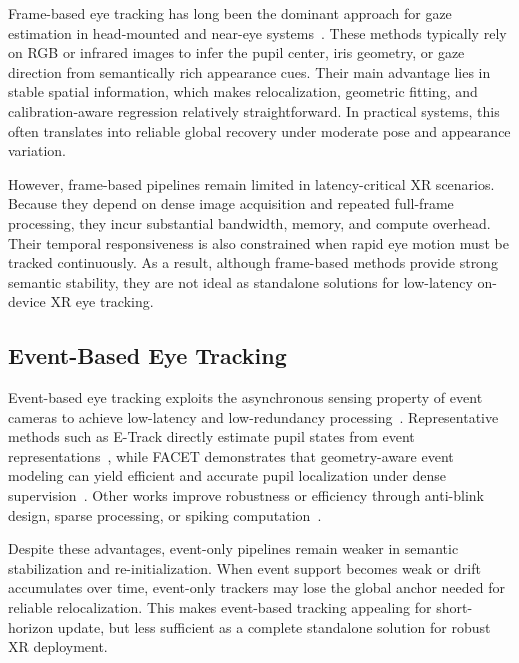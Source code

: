 ﻿\documentclass[journal]{IEEEtran}
\begin{document}
Frame-based eye tracking has long been the dominant approach for gaze estimation in head-mounted and near-eye systems~\cite{li2018etracker,chen2022real,jain2025flattrack}. These methods typically rely on RGB or infrared images to infer the pupil center, iris geometry, or gaze direction from semantically rich appearance cues. Their main advantage lies in stable spatial information, which makes relocalization, geometric fitting, and calibration-aware regression relatively straightforward. In practical systems, this often translates into reliable global recovery under moderate pose and appearance variation.

However, frame-based pipelines remain limited in latency-critical XR scenarios. Because they depend on dense image acquisition and repeated full-frame processing, they incur substantial bandwidth, memory, and compute overhead. Their temporal responsiveness is also constrained when rapid eye motion must be tracked continuously. As a result, although frame-based methods provide strong semantic stability, they are not ideal as standalone solutions for low-latency on-device XR eye tracking.

\subsection{Event-Based Eye Tracking}

Event-based eye tracking exploits the asynchronous sensing property of event cameras to achieve low-latency and low-redundancy processing~\cite{li2024gaze,li2023track,ding2025facet,zhang2024swift,sen2024eyetraes,chen20233et,chen2025event,feng2022real,lai2026efficient,wang2024event,lenero20113,zhao2025ev}. Representative methods such as E-Track directly estimate pupil states from event representations~\cite{li2023track}, while FACET demonstrates that geometry-aware event modeling can yield efficient and accurate pupil localization under dense supervision~\cite{ding2025facet}. Other works improve robustness or efficiency through anti-blink design, sparse processing, or spiking computation~\cite{zhang2024swift,sen2024eyetraes,sui2026event}.

Despite these advantages, event-only pipelines remain weaker in semantic stabilization and re-initialization. When event support becomes weak or drift accumulates over time, event-only trackers may lose the global anchor needed for reliable relocalization. This makes event-based tracking appealing for short-horizon update, but less sufficient as a complete standalone solution for robust XR deployment.
\end{document}
